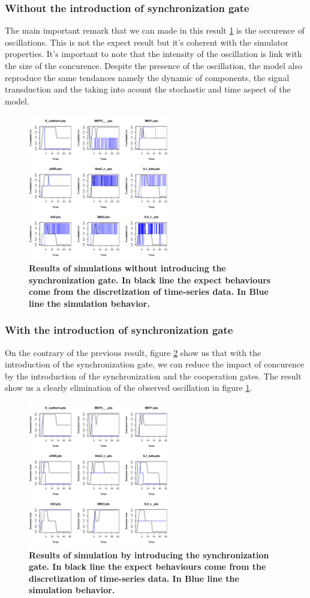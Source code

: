 \subsubsection{Without the introduction of synchronization gate}
The main important remark that we can made in this result \ref{rwos} is the occurence of oscillations. This is not the expect result 
but it's coherent with the simulator properties. It's important to note that the intensity of the oscillation is link with 
the size of the concurence. Despite the presence of the oscillation, the model also reproduce the same tendances namely
the dynamic of components, the signal transduction and the taking into acount the stochastic and time aspect of the model.
\begin{figure}[!t]
\centering
\includegraphics[width=2.5in]{images/resultWOS.pdf}
\caption{\bf Results of simulations without introducing the synchronization gate. In black line the expect behaviours
come from the discretization of time-series data. In Blue line the simulation behavior.}
\label{rwos}
\end{figure}
\subsubsection{With the introduction of synchronization gate}
On the contrary of the previous result, figure \ref{rws} show us that with the introduction of the synchronization gate, we can
reduce the impact of concurence by the introduction of the synchronization and the cooperation gates. The result show us a 
clearly elimination of the observed oscillation in figure \ref{rwos}. 

\begin{figure}[!t]
\centering
\includegraphics[width=2.5in]{images/resultWS.pdf}
\caption{\bf Results of simulation by introducing the synchronization gate. In black line the expect behaviours
come from the discretization of time-series data. In Blue line the simulation behavior.}
\label{rws}
\end{figure}


